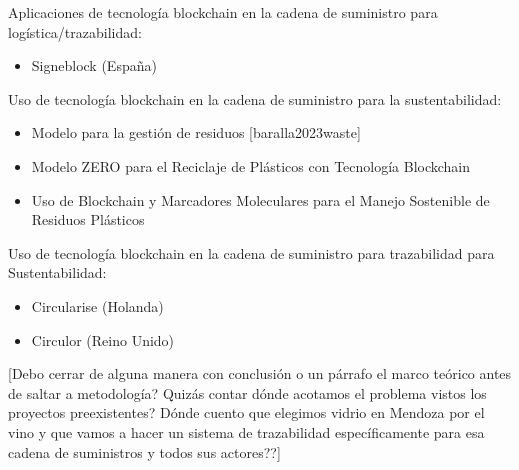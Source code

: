 Aplicaciones de tecnología blockchain en la cadena de suministro para logística/trazabilidad:
\begin{itemize}
    \item Signeblock (España)
\end{itemize}

Uso de tecnología blockchain en la cadena de suministro para la sustentabilidad:
\begin{itemize}
    \item Modelo para la gestión de residuos [baralla2023waste]
    \item Modelo ZERO para el Reciclaje de Plásticos con Tecnología Blockchain
    \item Uso de Blockchain y Marcadores Moleculares para el Manejo Sostenible de Residuos Plásticos
\end{itemize}

Uso de tecnología blockchain en la cadena de suministro para trazabilidad para Sustentabilidad:
\begin{itemize}
    \item Circularise (Holanda)
    \item Circulor (Reino Unido)
\end{itemize}

[Debo cerrar de alguna manera con conclusión o un párrafo el marco teórico antes de saltar a metodología? Quizás contar dónde acotamos el problema vistos los proyectos preexistentes? Dónde cuento que elegimos vidrio en Mendoza por el vino y que vamos a hacer un sistema de trazabilidad específicamente para esa cadena de suministros y todos sus actores??]
